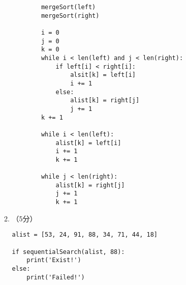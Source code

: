\documentclass[8pt]{article}
\begin{document}
\begin{CJK}{UTF8}{gkai}
\begin{enumerate}
\begin{enumerate}
\begin{lstlisting}
        mergeSort(left)
        mergeSort(right)

        i = 0
        j = 0 
        k = 0
        while i < len(left) and j < len(right):
            if left[i] < right[i]:
                alsit[k] = left[i]
                i += 1
            else:
                alist[k] = right[j]
                j += 1
        k += 1

        while i < len(left):
            alist[k] = left[i]
            i += 1
            k += 1

        while j < len(right):
            alist[k] = right[j]
            j += 1
            k += 1
    \end{lstlisting}
  \item （5分）~
    \begin{lstlisting}
alist = [53, 24, 91, 88, 34, 71, 44, 18]

if sequentialSearch(alist, 88):
    print('Exist!')
else:
    print('Failed!')


\end{lstlisting}
\end{enumerate}
\end{enumerate}
\end{CJK}
\end{document}
